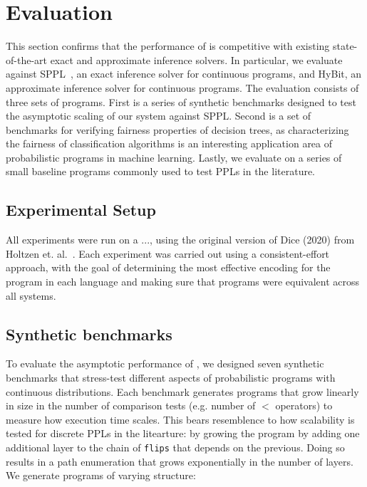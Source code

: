 \section{Evaluation}\label{sec:evaluation}
This section confirms that the performance of \Slice{} is competitive with existing state-of-the-art exact and approximate inference solvers. In particular, we evaluate \Slice{} against SPPL~\cite{Saad2021SPPL}, an exact inference solver for continuous programs, and HyBit, an approximate inference solver for continuous programs. The evaluation consists of three sets of programs. First is a series of synthetic benchmarks designed to test the asymptotic scaling of our system against SPPL. Second is a set of benchmarks for verifying fairness properties of decision trees, as characterizing the fairness of classification algorithms is an interesting application area of probabilistic programs in machine learning. Lastly, we evaluate \Slice{} on a series of small baseline programs commonly used to test PPLs in the literature. 

\subsection{Experimental Setup}\label{sec:experimenal-setup}
All experiments were run on a ..., using the original version of Dice (2020) from Holtzen et. al.~\cite{Holtzen2020Dice}. Each experiment was carried out using a consistent-effort approach, with the goal of determining the most effective encoding for the program in each language and making sure that programs were equivalent across all systems. 

\subsection{Synthetic benchmarks}\label{sec:synthetic-benchmarks}
To evaluate the asymptotic performance of \Slice{}, we designed seven synthetic benchmarks that stress-test different aspects of probabilistic programs with continuous distributions. Each benchmark generates programs that grow linearly in size in the number of comparison tests (e.g. number of $<$ operators) to measure how execution time scales. This bears resemblence to how scalability is tested for discrete PPLs in the litearture: by growing the program by adding one additional layer to the chain of \texttt{flips} that depends on the previous. Doing so results in a path enumeration that grows exponentially in the number of layers. We generate programs of varying structure:

